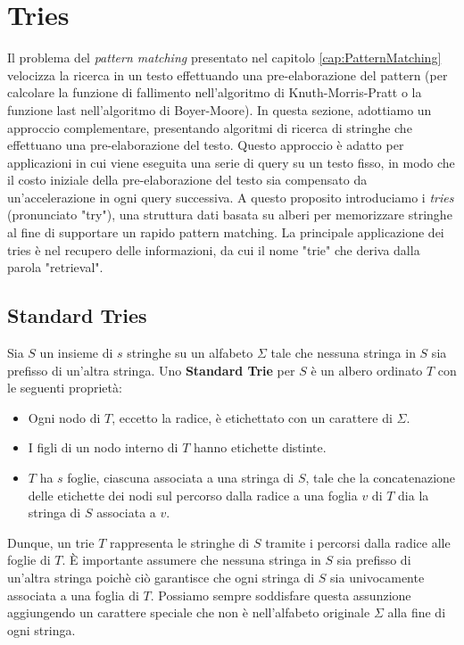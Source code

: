 \chapter{Tries}
\label{cap:Tries}

Il problema del \emph{pattern matching} presentato nel capitolo \ref{cap:PatternMatching} velocizza la ricerca in un testo effettuando una pre-elaborazione del pattern (per calcolare la funzione di fallimento nell'algoritmo di Knuth-Morris-Pratt o la funzione last nell'algoritmo di Boyer-Moore). In questa sezione, adottiamo un approccio complementare, presentando algoritmi di ricerca di stringhe che effettuano una pre-elaborazione del testo. Questo approccio è adatto per applicazioni in cui viene eseguita una serie di query su un testo fisso, in modo che il costo iniziale della pre-elaborazione del testo sia compensato da un'accelerazione in ogni query successiva. A questo proposito introduciamo i \emph{tries} (pronunciato "try"), una struttura dati basata su alberi per memorizzare stringhe al fine di supportare un rapido pattern matching. La principale applicazione dei tries è nel recupero delle informazioni, da cui il nome "trie" che deriva dalla parola "retrieval".


\section{Standard Tries}
Sia $S$ un insieme di $s$ stringhe su un alfabeto $\Sigma$ tale che nessuna stringa in $S$ sia prefisso di un'altra stringa. Uno \textbf{Standard Trie} per $S$ è un albero ordinato $T$ con le seguenti proprietà:
\begin{itemize}
    \item Ogni nodo di $T$, eccetto la radice, è etichettato con un carattere di $\Sigma$.
    \item I figli di un nodo interno di $T$ hanno etichette distinte.
    \item $T$ ha $s$ foglie, ciascuna associata a una stringa di $S$, tale che la concatenazione delle etichette dei nodi sul percorso dalla radice a una foglia $v$ di $T$ dia la stringa di $S$ associata a $v$.
\end{itemize}

\noindent
Dunque, un trie $T$ rappresenta le stringhe di $S$ tramite i percorsi dalla radice alle foglie di $T$. È importante assumere che nessuna stringa in $S$ sia prefisso di un'altra stringa poichè ciò garantisce che ogni stringa di $S$ sia univocamente associata a una foglia di $T$. Possiamo sempre soddisfare questa assunzione aggiungendo un carattere speciale che non è nell'alfabeto originale $\Sigma$ alla fine di ogni stringa.

